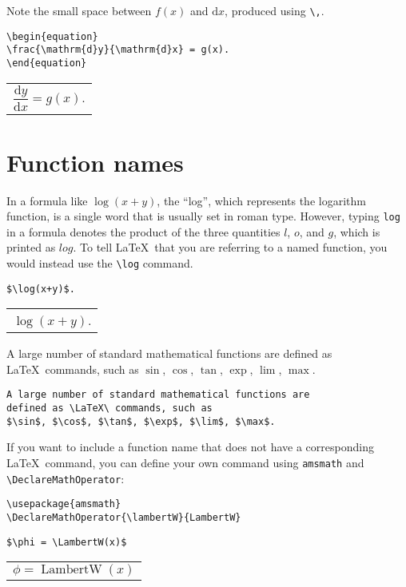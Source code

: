 \documentclass[a4paper]{tufte-handout}
\DeclareMathOperator{\lambertW}{LambertW}
\begin{document}
Note the small space between $f(x)$ and $\mathrm{d}x$, produced using \lstinline{\,}.

\begin{lstlisting}
\begin{equation}
\frac{\mathrm{d}y}{\mathrm{d}x} = g(x).
\end{equation}
\end{lstlisting}
\begin{tabular}{|p{10cm}}
\begin{equation*}
\frac{\mathrm{d}y}{\mathrm{d}x} = g(x).
\end{equation*}
\end{tabular}

\section{Function names}
In a formula like $\log(x +y)$, the ``log'', which represents the logarithm function, is a single word that is usually set in roman type. However, typing \lstinline{log} in a formula denotes the product of the three quantities $l$, $o$, and $g$, which is printed as $log$. To tell \LaTeX\ that you are referring to a named function, you would instead use the \lstinline{\log} command.
\begin{lstlisting}
$\log(x+y)$.
\end{lstlisting}
\begin{tabular}{|p{10cm}}
$\log(x+y)$.
\end{tabular}

A large number of standard mathematical functions are defined as \LaTeX\ commands, such as $\sin$, $\cos$, $\tan$, $\exp$, $\lim$, $\max$.
\begin{lstlisting}
A large number of standard mathematical functions are 
defined as \LaTeX\ commands, such as 
$\sin$, $\cos$, $\tan$, $\exp$, $\lim$, $\max$.
\end{lstlisting}

If you want to include a function name that does not have a corresponding \LaTeX\ command, you can define your own command using \lstinline{amsmath} and \lstinline{\DeclareMathOperator}:
\begin{lstlisting}
\usepackage{amsmath}
\DeclareMathOperator{\lambertW}{LambertW}
\end{lstlisting}
\begin{lstlisting}
$\phi = \LambertW(x)$
\end{lstlisting}
\begin{tabular}{|p{10cm}}
$\phi = \lambertW(x)$
\end{tabular}
\end{document}
